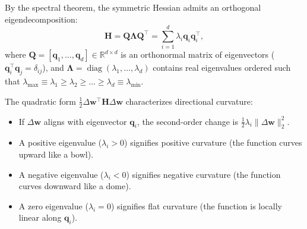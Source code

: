 By the spectral theorem, the symmetric Hessian admits an orthogonal eigendecomposition:
\begin{equation}
\mathbf{H} = \mathbf{Q} \mathbf{\Lambda} \mathbf{Q}^\top = \sum_{i=1}^d \lambda_i \mathbf{q}_i \mathbf{q}_i^\top,
\label{eq:hessian_spectral}
\end{equation}
where $\mathbf{Q} = [\mathbf{q}_1, \dots, \mathbf{q}_d] \in \mathbb{R}^{d \times d}$ is an orthonormal matrix of eigenvectors ($\mathbf{q}_i^\top \mathbf{q}_j = \delta_{ij}$), and $\mathbf{\Lambda} = \operatorname{diag}(\lambda_1, \dots, \lambda_d)$ contains real eigenvalues ordered such that $\lambda_{\max} \equiv \lambda_1 \ge \lambda_2 \ge \dots \ge \lambda_d \equiv \lambda_{\min}$.

The quadratic form $\frac{1}{2} \Delta \mathbf{w}^\top \mathbf{H} \Delta \mathbf{w}$ characterizes directional curvature:
\begin{itemize}[noitemsep]
  \item If $\Delta \mathbf{w}$ aligns with eigenvector $\mathbf{q}_i$, the second-order change is $\frac{1}{2} \lambda_i \|\Delta \mathbf{w}\|_2^2$.
  \item A positive eigenvalue ($\lambda_i > 0$) signifies positive curvature (the function curves upward like a bowl).
  \item A negative eigenvalue ($\lambda_i < 0$) signifies negative curvature (the function curves downward like a dome).
  \item A zero eigenvalue ($\lambda_i = 0$) signifies flat curvature (the function is locally linear along $\mathbf{q}_i$).
\end{itemize}

